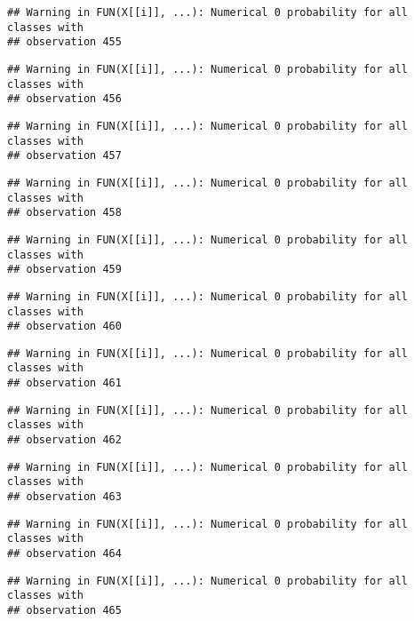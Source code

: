 \documentclass[
]{article}
\begin{document}
\begin{verbatim}
## Warning in FUN(X[[i]], ...): Numerical 0 probability for all classes with
## observation 455
\end{verbatim}

\begin{verbatim}
## Warning in FUN(X[[i]], ...): Numerical 0 probability for all classes with
## observation 456
\end{verbatim}

\begin{verbatim}
## Warning in FUN(X[[i]], ...): Numerical 0 probability for all classes with
## observation 457
\end{verbatim}

\begin{verbatim}
## Warning in FUN(X[[i]], ...): Numerical 0 probability for all classes with
## observation 458
\end{verbatim}

\begin{verbatim}
## Warning in FUN(X[[i]], ...): Numerical 0 probability for all classes with
## observation 459
\end{verbatim}

\begin{verbatim}
## Warning in FUN(X[[i]], ...): Numerical 0 probability for all classes with
## observation 460
\end{verbatim}

\begin{verbatim}
## Warning in FUN(X[[i]], ...): Numerical 0 probability for all classes with
## observation 461
\end{verbatim}

\begin{verbatim}
## Warning in FUN(X[[i]], ...): Numerical 0 probability for all classes with
## observation 462
\end{verbatim}

\begin{verbatim}
## Warning in FUN(X[[i]], ...): Numerical 0 probability for all classes with
## observation 463
\end{verbatim}

\begin{verbatim}
## Warning in FUN(X[[i]], ...): Numerical 0 probability for all classes with
## observation 464
\end{verbatim}

\begin{verbatim}
## Warning in FUN(X[[i]], ...): Numerical 0 probability for all classes with
## observation 465
\end{verbatim}
\end{document}
